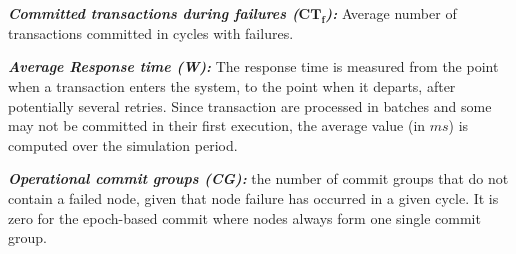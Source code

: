 \noindent \textbf{\emph{Committed transactions during failures ($\bm{CT_f}$):}} Average number of 
transactions committed in cycles with failures. 

\noindent \textbf{\emph{Average Response time (W):}} The response time is measured from the point when a 
transaction enters the system, to the point when it departs, after potentially several retries. Since 
transaction are processed in batches and some may not be committed in their first execution, the average value 
(in $ms$) is computed over the simulation period.

\noindent \textbf{\emph{Operational commit groups (CG):}} the number of commit groups that do not contain a 
failed node, given that node failure has occurred in a given cycle. It is zero for the epoch-based commit 
where nodes always form one single commit group.


